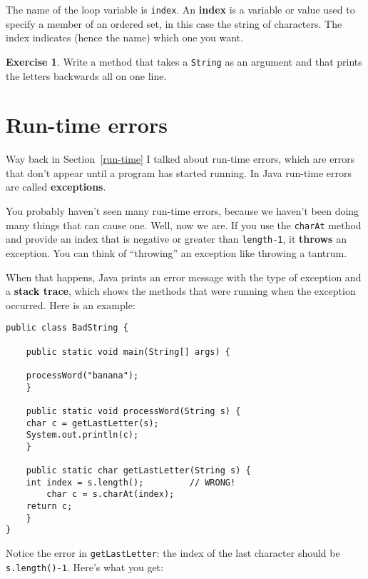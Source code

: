 \documentclass[12pt]{book}
\theoremstyle{definition}
\newtheorem{excz}{Exercise}[chapter]
\newenvironment{exercise}{\bigskip\begin{excz}\mbox{}}{\end{excz}}
\begin{document}

The name of the loop variable is {\tt index}.  An {\bf
index} is a variable or value used to specify a member of an ordered
set, in this case the string of characters.  The index
indicates (hence the name) which one you want.

\begin{exercise}
Write a method that takes a {\tt String}
as an argument and that prints the letters backwards all on
one line.
\end{exercise}

\section{Run-time errors}

Way back in Section~\ref{run-time} I talked about run-time errors,
which are errors that don't appear until a program has started
running.  In Java run-time errors are called {\bf exceptions}.

You probably haven't seen many run-time errors, because we
haven't been doing many things that can cause one.  Well, now we are.
If you use the {\tt charAt} method and provide an index that is
negative or greater than {\tt length-1}, it {\bf throws} an exception.
You can think of ``throwing'' an exception like throwing
a tantrum.

When that happens, Java prints an error message with
the type of exception and a {\bf stack trace}, which shows the methods
that were running when the exception occurred.  Here is an example:

\begin{lstlisting}
public class BadString {

    public static void main(String[] args) {
	
	processWord("banana");
    }

    public static void processWord(String s) {
	char c = getLastLetter(s);
	System.out.println(c);
    }

    public static char getLastLetter(String s) {
	int index = s.length();         // WRONG!
        char c = s.charAt(index);
	return c;
    }
}
\end{lstlisting}

Notice the error in {\tt getLastLetter}: the index of the last
character should be {\tt s.length()-1}.  Here's what you get:
\end{document}
